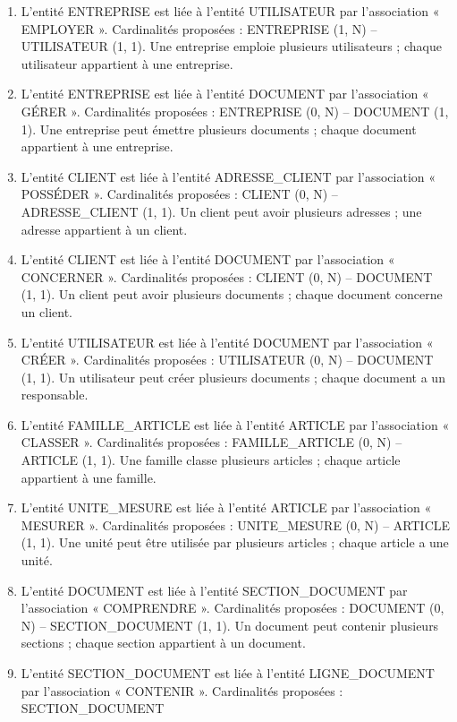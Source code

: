 \documentclass[11pt,a4paper]{article}
\begin{document}
\begin{enumerate}[leftmargin=*,itemsep=4pt]
\item L'entité ENTREPRISE est liée à l'entité UTILISATEUR par l'association
  « EMPLOYER ». Cardinalités proposées : ENTREPRISE (1, N) -- UTILISATEUR
  (1, 1). Une entreprise emploie plusieurs utilisateurs ; chaque utilisateur
  appartient à une entreprise.
\item L'entité ENTREPRISE est liée à l'entité DOCUMENT par l'association
  « GÉRER ». Cardinalités proposées : ENTREPRISE (0, N) -- DOCUMENT (1, 1).
  Une entreprise peut émettre plusieurs documents ; chaque document appartient
  à une entreprise.
\item L'entité CLIENT est liée à l'entité ADRESSE\_CLIENT par l'association
  « POSSÉDER ». Cardinalités proposées : CLIENT (0, N) -- ADRESSE\_CLIENT
  (1, 1). Un client peut avoir plusieurs adresses ; une adresse appartient à
  un client.
\item L'entité CLIENT est liée à l'entité DOCUMENT par l'association
  « CONCERNER ». Cardinalités proposées : CLIENT (0, N) -- DOCUMENT (1, 1).
  Un client peut avoir plusieurs documents ; chaque document concerne un
  client.
\item L'entité UTILISATEUR est liée à l'entité DOCUMENT par l'association
  « CRÉER ». Cardinalités proposées : UTILISATEUR (0, N) -- DOCUMENT (1, 1).
  Un utilisateur peut créer plusieurs documents ; chaque document a un
  responsable.
\item L'entité FAMILLE\_ARTICLE est liée à l'entité ARTICLE par l'association
  « CLASSER ». Cardinalités proposées : FAMILLE\_ARTICLE (0, N) -- ARTICLE
  (1, 1). Une famille classe plusieurs articles ; chaque article appartient à
  une famille.
\item L'entité UNITE\_MESURE est liée à l'entité ARTICLE par l'association
  « MESURER ». Cardinalités proposées : UNITE\_MESURE (0, N) -- ARTICLE
  (1, 1). Une unité peut être utilisée par plusieurs articles ; chaque article
  a une unité.
\item L'entité DOCUMENT est liée à l'entité SECTION\_DOCUMENT par
  l'association « COMPRENDRE ». Cardinalités proposées : DOCUMENT (0, N) --
  SECTION\_DOCUMENT (1, 1). Un document peut contenir plusieurs sections ;
  chaque section appartient à un document.
\item L'entité SECTION\_DOCUMENT est liée à l'entité LIGNE\_DOCUMENT par
  l'association « CONTENIR ». Cardinalités proposées : SECTION\_DOCUMENT

\end{enumerate}
\end{document}
